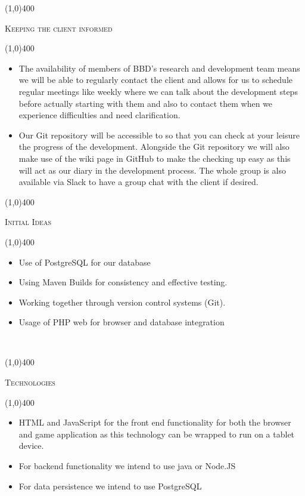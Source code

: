 \documentclass[12pt,a4paper]{report}
\begin{document}
\begin{center}
	
	\line(1,0){400}\\
	{\scshape\large Keeping the client informed \par}
	\line(1,0){400}\\
	\end{center}
		\begin{itemize}
\item The availability of members of BBD's research and development team means we will be able to regularly contact the client and allows for us to schedule regular meetings like weekly where we can talk about the development steps before actually starting with them and also to contact them when we experience difficulties and need clarification.
\item Our Git repository will be accessible to so that you can check
at your leisure the progress of the development. Alongside the Git
repository we will also make use of the wiki page in GitHub to make
the checking up easy as this will act as our diary in the development
process. The whole group is also available via Slack to have a group
chat with the client if desired.
\end{itemize}

\begin{center}
	
	\line(1,0){400}\\
	{\scshape\large Initial Ideas \par}
	\line(1,0){400}\\
	\end{center}
		\begin{itemize}
\item Use of PostgreSQL for our database
\item Using Maven Builds for consistency and effective testing.
\item Working together through version control systems (Git).
\item Usage of PHP web for browser and database integration
\end{itemize}
\newpage
\vspace*{-3cm}\
\begin{center}
	
	\line(1,0){400}\\
	{\scshape\large Technologies \par}
	\line(1,0){400}\\
	\end{center}
		\begin{itemize}
\item HTML and JavaScript for the front end functionality for both the browser and game application as this technology can be wrapped to run on a tablet device.
\item For backend functionality we intend to use java or Node.JS
\item For data persistence we intend to use PostgreSQL
\end{itemize}
\end{document}
